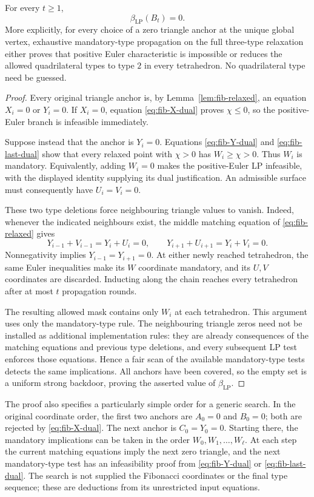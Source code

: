 \begin{theorem}
\label{thm:fib-zero-backdoor}
For every $t\ge1$,
\[
 \beta_{\mathrm{LP}}(B_t)=0.
\]
More explicitly, for every choice of a zero triangle anchor at the unique
global vertex, exhaustive mandatory-type propagation on the full three-type
relaxation either proves that positive Euler characteristic is impossible
or reduces the allowed quadrilateral types to type $2$ in every tetrahedron.
No quadrilateral type need be guessed.
\end{theorem}

\begin{proof}
Every original triangle anchor is, by Lemma~\ref{lem:fib-relaxed}, an
equation $X_i=0$ or $Y_i=0$.  If $X_i=0$, equation
\eqref{eq:fib-X-dual} proves $\chi\le0$, so the positive-Euler branch is
infeasible immediately.

Suppose instead that the anchor is $Y_i=0$.  Equations
\eqref{eq:fib-Y-dual} and \eqref{eq:fib-last-dual} show that every relaxed
point with $\chi>0$ has $W_i\ge\chi>0$.  Thus $W_i$ is mandatory.
Equivalently, adding $W_i=0$ makes the positive-Euler LP infeasible, with
the displayed identity supplying its dual justification.  An admissible
surface must consequently have $U_i=V_i=0$.

These two type deletions force neighbouring triangle values to vanish.
Indeed, whenever the indicated neighbours exist, the middle matching
equation of \eqref{eq:fib-relaxed} gives
\[
 Y_{i-1}+V_{i-1}=Y_i+U_i=0,
 \qquad
 Y_{i+1}+U_{i+1}=Y_i+V_i=0.
\]
Nonnegativity implies $Y_{i-1}=Y_{i+1}=0$.  At either newly reached
tetrahedron, the same Euler inequalities make its $W$ coordinate mandatory,
and its $U,V$ coordinates are discarded.  Inducting along the chain reaches
every tetrahedron after at most $t$ propagation rounds.

The resulting allowed mask contains only $W_i$ at each tetrahedron.  This
argument uses only the mandatory-type rule.  The neighbouring triangle
zeros need not be installed as additional implementation rules: they are
already consequences of the matching equations and previous type deletions,
and every subsequent LP test enforces those equations.  Hence a fair scan
of the available mandatory-type tests detects the same implications.
All anchors have been covered, so the empty set is a uniform strong
backdoor, proving the asserted value of $\beta_{\mathrm{LP}}$.
\end{proof}

The proof also specifies a particularly simple order for a generic search.
In the original coordinate order, the first two anchors are $A_0=0$ and
$B_0=0$; both are rejected by \eqref{eq:fib-X-dual}.  The next anchor is
$C_0=Y_0=0$.  Starting there, the mandatory implications can be taken in
the order $W_0,W_1,\ldots,W_\ell$.  At each step the current matching
equations imply the next zero triangle, and the next mandatory-type test
has an infeasibility proof from \eqref{eq:fib-Y-dual} or
\eqref{eq:fib-last-dual}.  The search is not supplied the Fibonacci
coordinates or the final type sequence; these are deductions from its
unrestricted input equations.

